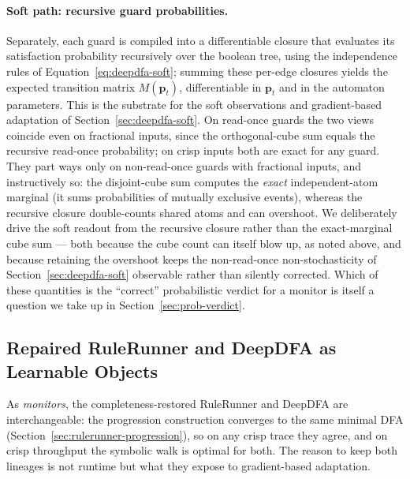 \paragraph{Soft path: recursive guard probabilities.} Separately, each guard is compiled into a differentiable closure that evaluates its satisfaction probability recursively over the boolean tree, using the independence rules of Equation~\eqref{eq:deepdfa-soft}; summing these per-edge closures yields the expected transition matrix $M(\mathbf{p}_t)$, differentiable in $\mathbf{p}_t$ and in the automaton parameters. This is the substrate for the soft observations and gradient-based adaptation of Section~\ref{sec:deepdfa-soft}. On read-once guards the two views coincide even on fractional inputs, since the orthogonal-cube sum equals the recursive read-once probability; on crisp inputs both are exact for any guard. They part ways only on non-read-once guards with fractional inputs, and instructively so: the disjoint-cube sum computes the \emph{exact} independent-atom marginal (it sums probabilities of mutually exclusive events), whereas the recursive closure double-counts shared atoms and can overshoot. We deliberately drive the soft readout from the recursive closure rather than the exact-marginal cube sum --- both because the cube count can itself blow up, as noted above, and because retaining the overshoot keeps the non-read-once non-stochasticity of Section~\ref{sec:deepdfa-soft} observable rather than silently corrected. Which of these quantities is the ``correct'' probabilistic verdict for a monitor is itself a question we take up in Section~\ref{sec:prob-verdict}.


\subsection{Repaired RuleRunner and DeepDFA as Learnable Objects}
\label{sec:theory-learnable}

As \emph{monitors}, the completeness-restored RuleRunner and DeepDFA are interchangeable: the progression construction converges to the same minimal DFA (Section~\ref{sec:rulerunner-progression}), so on any crisp trace they agree, and on crisp throughput the symbolic walk is optimal for both. The reason to keep both lineages is not runtime but what they expose to gradient-based adaptation.

